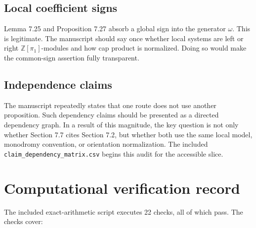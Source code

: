 \documentclass[
  10pt,
]{article}
\begin{document}
\subsection{Local coefficient signs}\label{local-coefficient-signs}

Lemma 7.25 and Proposition 7.27 absorb a global sign into the generator
\(\omega\). This is legitimate. The manuscript should say once whether
local systems are left or right \(\mathbb Z[\pi_1]\)-modules and how cap
product is normalized. Doing so would make the common-sign assertion
fully transparent.

\subsection{Independence claims}\label{independence-claims}

The manuscript repeatedly states that one route does not use another
proposition. Such dependency claims should be presented as a directed
dependency graph. In a result of this magnitude, the key question is not
only whether Section 7.7 cites Section 7.2, but whether both use the
same local model, monodromy convention, or orientation normalization.
The included \texttt{claim\_dependency\_matrix.csv} begins this audit
for the accessible slice.

\section{Computational verification
record}\label{computational-verification-record}

The included exact-arithmetic script executes 22 checks, all of which
pass. The checks cover:
\end{document}

